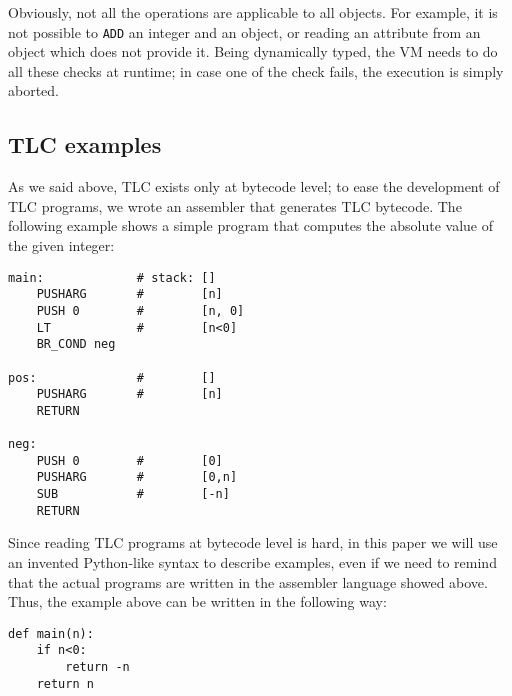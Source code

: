 Obviously, not all the operations are applicable to all objects. For example,
it is not possible to \lstinline{ADD} an integer and an object, or reading an
attribute from an object which does not provide it.  Being dynamically typed,
the VM needs to do all these checks at runtime; in case one of the check
fails, the execution is simply aborted.

\subsection{TLC examples}

As we said above, TLC exists only at bytecode level; to ease the development
of TLC programs, we wrote an assembler that generates TLC bytecode. The
following example shows a simple program that computes the absolute value of
the given integer:

\begin{lstlisting}
main:             # stack: []
    PUSHARG       #        [n]
    PUSH 0        #        [n, 0]
    LT            #        [n<0]
    BR_COND neg

pos:              #        []
    PUSHARG       #        [n]
    RETURN

neg:
    PUSH 0        #        [0]
    PUSHARG       #        [0,n]
    SUB           #        [-n]
    RETURN
\end{lstlisting}

Since reading TLC programs at bytecode level is hard, in this paper we will
use an invented Python-like syntax to describe examples, even if we need to
remind that the actual programs are written in the assembler language showed
above. Thus, the example above can be written in the following way:

\begin{lstlisting}
def main(n):
    if n<0:
        return -n
    return n
\end{lstlisting}
